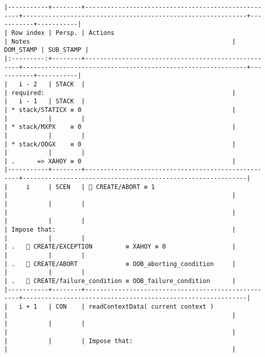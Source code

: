 \documentclass[varwidth=\maxdimen,margin=0.5cm,multi={verbatim}]{standalone}
\begin{document}
\begin{verbatim}
|-----------+--------+----------------------------------------------------+-------------------------------------------------------------+-----------+-----------|
| Row index | Persp. | Actions                                            | Notes                                                       | DOM_STAMP | SUB_STAMP |
|:---------:+--------+----------------------------------------------------+-------------------------------------------------------------+-----------+-----------|
|   i - 2   | STACK  |                                                    | required:                                                   |
|   i - 1   | STACK  |                                                    | * stack/STATICX ≡ 0                                         |
|           |        |                                                    | * stack/MXPX    ≡ 0                                         |
|           |        |                                                    | * stack/OOGX    ≡ 0                                         |
|           |        |                                                    | .      => XAHOY ≡ 0                                         |
|-----------+--------+----------------------------------------------------+-------------------------------------------------------------|
|     i     | SCEN   |  CREATE/ABORT ≡ 1                                 |                                                             |
|           |        |                                                    |                                                             |
|           |        |                                                    | Impose that:                                                |
|           |        |                                                    | .    CREATE/EXCEPTION         ≡ XAHOY ≡ 0                  |
|           |        |                                                    | .    CREATE/ABORT             ≡ OOB_aborting_condition     |
|           |        |                                                    | .    CREATE/failure_condition ≡ OOB_failure_condition      |
|-----------+--------+----------------------------------------------------+-------------------------------------------------------------|
|   i + 1   | CON    | readContextData( current context )                 |                                                             |
|           |        |                                                    |                                                             |
|           |        | Impose that:                                       |                                                             |

\end{verbatim}
\end{document}
